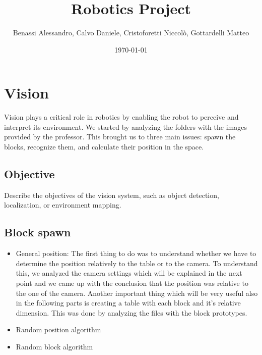 \documentclass[12pt,a4paper]{article}
\title{Robotics Project}
\author{Benassi Alessandro, Calvo Daniele, Cristoforetti Niccolò, Gottardelli Matteo}
\date{\today}
\begin{document}
\maketitle
\tableofcontents
\newpage

\section{Vision}\label{sec:vision}
Vision plays a critical role in robotics by enabling the robot to perceive and interpret its environment. 
We started by analyzing the folders with the images provided by the professor. This brought us to three main issues: spawn the blocks, recognize them, and calculate their position in the space. 

\subsection{Objective}\label{subsec:vobj}
Describe the objectives of the vision system, such as object detection, localization, or environment mapping.

\subsection{Block spawn}\label{subsec:blockspawn}

\begin{itemize}
    \item General position: The first thing to do was to understand whether we have to determine the position relatively to the table or to the camera. To understand this, we analyzed the camera settings which will be explained in the next point and we came up with the conclusion that the position was relative to the one of the camera.
    Another important thing which will be very useful also in the following parts is creating a table with each block and it's relative dimension. This was done by analyzing the files with the block prototypes.
    \item Random position algorithm
    \item Random block algorithm
\end{itemize}
\end{document}
